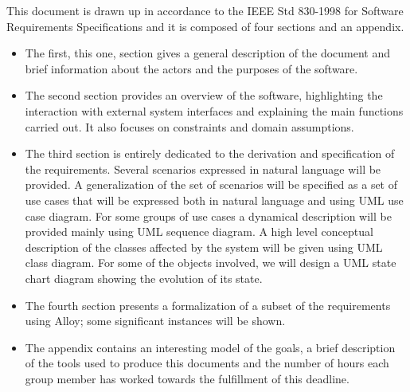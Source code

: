 This document is drawn up in accordance to the IEEE Std 830-1998 for
Software Requirements Specifications and it is composed of four sections
and an appendix.
\begin{itemize}
\item The first, this one, section gives a general description of the document
and brief information about the actors and the purposes of the software.
\item The second section provides an overview of the software, highlighting
the interaction with external system interfaces and explaining the
main functions carried out. It also focuses on constraints and domain
assumptions.
\item The third section is entirely dedicated to the derivation and specification
of the requirements. Several scenarios expressed in natural language
will be provided. A generalization of the set of scenarios will be
specified as a set of use cases that will be expressed both in natural
language and using UML use case diagram. For some groups of use cases
a dynamical description will be provided mainly using UML sequence
diagram. A high level conceptual description of the classes affected
by the system will be given using UML class diagram. For some of the
objects involved, we will design a UML state chart diagram showing
the evolution of its state. 
\item The fourth section presents a formalization of a subset of the requirements
using Alloy; some significant instances will be shown.
\item The appendix contains an interesting model of the goals, a brief description
of the tools used to produce this documents and the number of hours
each group member has worked towards the fulfillment of this deadline.\end{itemize}

